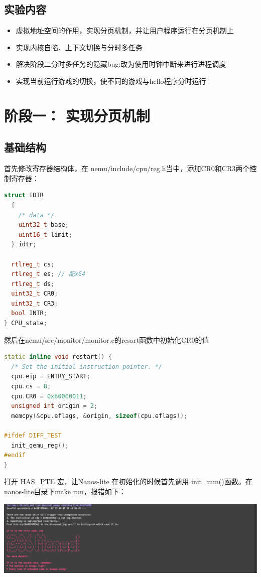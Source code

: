 \documentclass[UTF8,a4paper,10pt]{ctexart}
\begin{document}
\subsection{实验内容}
\begin{itemize}
  \item 虚拟地址空间的作用，实现分页机制，并让用户程序运行在分页机制上
  \item 实现内核自陷、上下文切换与分时多任务
  \item 解决阶段二分时多任务的隐藏bug:改为使用时钟中断来进行进程调度
  \item 实现当前运行游戏的切换，使不同的游戏与hello程序分时运行
\end{itemize}

\section{阶段一： 实现分页机制}
\subsection{基础结构}
首先修改寄存器结构体，在 nemu/include/cpu/reg.h当中，添加CR0和CR3两个控制寄存器：
\begin{lstlisting}[language=C++]
struct IDTR
  {
    /* data */
    uint32_t base;
    uint16_t limit; 
  } idtr;
  
  rtlreg_t cs;
  rtlreg_t es; // 配x64
  rtlreg_t ds;
  uint32_t CR0;
  uint32_t CR3;
  bool INTR;
} CPU_state;
\end{lstlisting}
然后在nemu/src/monitor/monitor.c的resart函数中初始化CR0的值
\begin{lstlisting}[language = C++]
static inline void restart() {
  /* Set the initial instruction pointer. */
  cpu.eip = ENTRY_START;
  cpu.cs = 8;
  cpu.CR0 = 0x60000011;
  unsigned int origin = 2;
  memcpy(&cpu.eflags, &origin, sizeof(cpu.eflags));

#ifdef DIFF_TEST
  init_qemu_reg();
#endif
}
\end{lstlisting}
打开 HAS\_PTE 宏，让Nanos-lite 在初始化的时候首先调用 init\_mm()函数。在nanos-lite目录下make run，报错如下：
\begin{center}
  \includegraphics*[scale = 0.5]{img/1}
\end{center}
\end{document}
